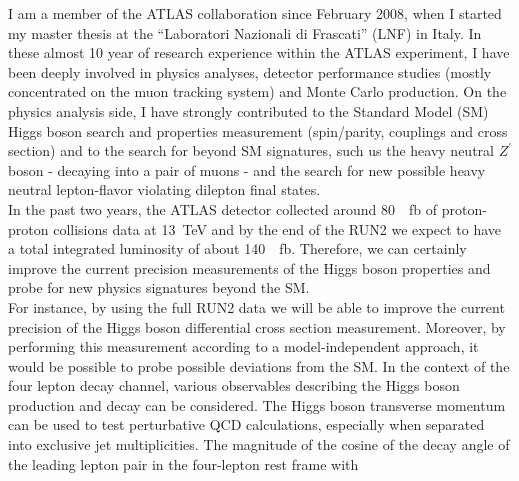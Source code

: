 
\begin{cvinterests}


\cvinterest
{
I am a member of the ATLAS collaboration since February 2008, when I started my
master thesis at the ``Laboratori Nazionali di Frascati'' (LNF) in
Italy. In these almost 10 year of research experience within the ATLAS
experiment, I have been deeply involved in physics analyses, detector
performance studies (mostly concentrated on the muon tracking system) and
Monte Carlo production. On the physics analysis side, I have strongly
contributed to the Standard Model (SM) Higgs boson search and properties
measurement (spin/parity, couplings and cross section) and to the search for
beyond SM signatures, such us the heavy neutral $Z^{\prime}$ boson - decaying
into a pair of muons - and the search for new possible heavy neutral
lepton-flavor violating dilepton final states.\\
%
In the past two years, the ATLAS detector collected around
\SI{80}{\per\femto\barn} of proton-proton collisions data at
\SI{13}{\tera\electronvolt} and by the end of the RUN2 we expect to have a total
integrated luminosity of about \SI{140}{\per\femto\barn}. Therefore, we can
certainly improve the current precision measurements of the Higgs boson
properties and probe for new physics signatures beyond the SM.\\
For instance, by using the full RUN2 data we will be able to improve the
current precision of the Higgs boson differential cross section measurement.
Moreover, by performing this measurement according to a model-independent
approach, it would be possible to probe possible deviations from the SM. In the
context of the four lepton decay channel, various observables describing the
Higgs boson production and decay can be considered. The Higgs boson transverse
momentum can be used to test perturbative QCD calculations, especially when
separated into exclusive jet multiplicities. The magnitude of the cosine of the
decay angle of the leading lepton pair in the four-lepton rest frame with
}
\end{cvinterests}
